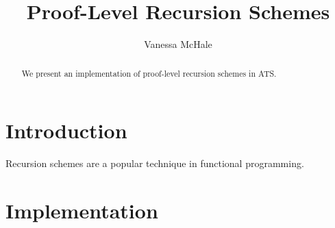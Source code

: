 \documentclass{article}
\begin{document}
\title{Proof-Level Recursion Schemes}
\author{Vanessa McHale}
\maketitle

\begin{abstract}
    We present an implementation of proof-level recursion schemes in ATS.
\end{abstract}

\section{Introduction}

Recursion schemes are a popular technique in functional programming.

\section{Implementation}
\end{document}
